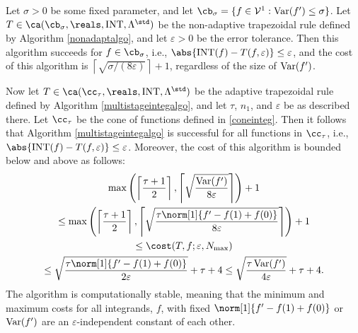 \begin{theorem} \label{multistageintegthm}
Let $\sigma >0$ be some fixed parameter, and let $\cb_{\sigma}=\{f \in  \mathcal{V}^{1} : \Var(f')\leq \sigma\}$. Let $T \in \ca(\cb_{\sigma}, \reals, \INT, \Lambda^{\std})$ be the non-adaptive trapezoidal rule defined by Algorithm \ref{nonadaptalgo}, and let $\varepsilon>0$ be the error tolerance. Then this algorithm succeeds for $f \in \cb_{\sigma}$, i.e., $\abs{\INT(f) - T(f,\varepsilon)} \le \varepsilon$, and the cost of this algorithm is $\left \lceil \sqrt{\sigma/(8\varepsilon)}\right \rceil + 1$, regardless of the size of $\operatorname{Var}(f')$.

Now let $T \in \ca(\cc_{\tau}, \reals, \INT, \Lambda^{\std})$ be the adaptive trapezoidal rule defined by Algorithm \ref{multistageintegalgo}, and let $\tau$, $n_1$, and $\varepsilon$ be as described there. Let $\cc_\tau$ be the cone of functions defined in \eqref{coneinteg}.  Then it follows that Algorithm \ref{multistageintegalgo} is successful for all functions in $\cc_{\tau}$,  i.e.,  $\abs{\INT(f) - T(f,\varepsilon)} \le \varepsilon$.  Moreover, the cost of this algorithm is bounded below and above as follows:
\begin{multline}
\max \left(\left \lceil\frac{\tau+1}{2} \right \rceil, \left \lceil \sqrt{\frac{ \Var(f')}{8\varepsilon}} \right \rceil \right) +1 \\
\le \max \left(\left \lceil\frac{\tau+1}{2} \right \rceil, \left \lceil \sqrt{\frac{\tau \norm[1]{f'-f(1)+f(0)}}{8\varepsilon}} \right \rceil \right) +1 \\
\le
\cost(T,f;\varepsilon,N_{\max}) \\
\le \sqrt{\frac{\tau \norm[1]{f'-f(1)+f(0)}}{2\varepsilon}} + \tau + 4
\le \sqrt{\frac{\tau \Var(f') }{4\varepsilon}} + \tau + 4.
\end{multline}
The algorithm is computationally stable, meaning that the minimum and maximum costs for all integrands, $f$, with fixed $\norm[1]{f'-f(1)+f(0)}$ or $\operatorname{Var}(f')$ are an $\varepsilon$-independent constant of each other.
\end{theorem}


